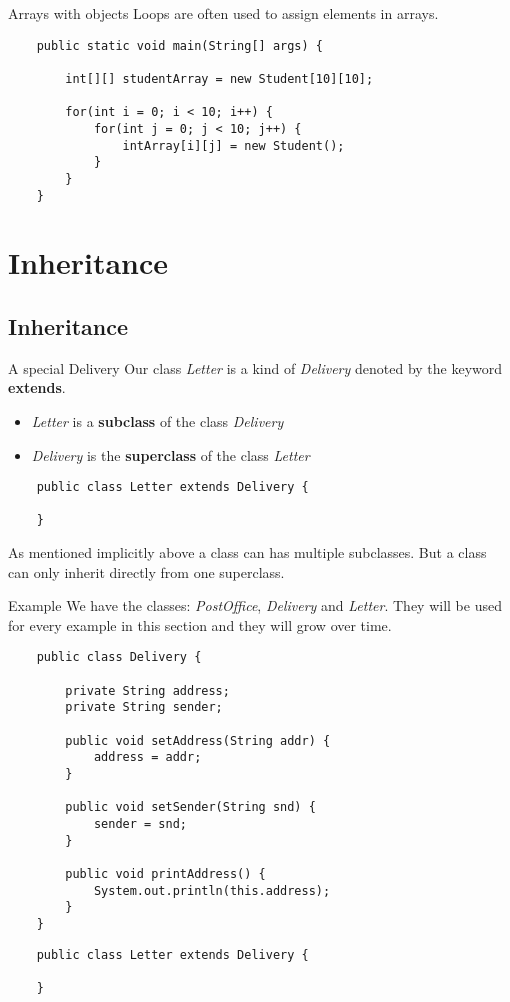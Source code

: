 \begin{frame}[fragile]{Arrays with objects}
	Loops are often used to assign elements in arrays.
	\begin{lstlisting}
	public static void main(String[] args) {

	    int[][] studentArray = new Student[10][10];
	    
	    for(int i = 0; i < 10; i++) {
	        for(int j = 0; j < 10; j++) {
	            intArray[i][j] = new Student();
	        }
	    }
	}
	\end{lstlisting}
\end{frame}

\section{Inheritance}
\subsection{Inheritance}


\begin{frame}[fragile]{A special Delivery}
	Our class \emph{Letter} is a kind of \emph{Delivery} denoted by the keyword \textbf{extends}.
	\begin{itemize}
		\item \emph{Letter} is a \textbf{subclass} of the class \emph{Delivery}
		\item \emph{Delivery} is the \textbf{superclass} of the class \emph{Letter}
	\end{itemize}
	\begin{lstlisting}
	public class Letter extends Delivery {
	
	}
	\end{lstlisting}
	\vfill
	As mentioned implicitly above a class can has multiple subclasses. 
	But a class can only inherit directly from one superclass.
\end{frame}

\begin{frame}[fragile]{Example}
	We have the classes: \emph{PostOffice}, \emph{Delivery} and \emph{Letter}.
	They will be used for every example in this section and they will grow over time.
	\begin{lstlisting}
	public class Delivery {
	
	    private String address;
	    private String sender;
	    
	    public void setAddress(String addr) {
			address = addr;
	    }
	    
	    public void setSender(String snd) {
			sender = snd;
	    }
	    
	    public void printAddress() {
	        System.out.println(this.address);
	    }
	}
	\end{lstlisting}
	
	\begin{lstlisting}
	public class Letter extends Delivery {
	
	}
	\end{lstlisting}
\end{frame}

